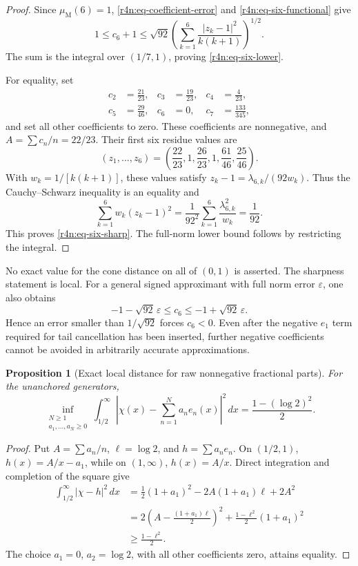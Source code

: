 \documentclass[11pt,a4paper]{article}
\newtheorem{proposition}[theorem]{Proposition}
\theoremstyle{definition}\newtheorem{definition}[theorem]{Definition}
\theoremstyle{remark}\newtheorem{remark}[theorem]{Remark}
\numberwithin{equation}{section}
\begin{document}
\begin{proof}
Since $\mu_{\mathrm M}(6)=1$,
\eqref{r4n:eq-coefficient-error} and \eqref{r4n:eq-six-functional}
give
\[
 1\le c_6+1
 \le\sqrt{92}
       \left(\sum_{k=1}^6\frac{|z_k-1|^2}{k(k+1)}\right)^{1/2}.
\]
The sum is the integral over $(1/7,1)$, proving
\eqref{r4n:eq-six-lower}.

For equality, set
\begin{equation}
\label{r4n:eq-six-coefficients}
 \begin{aligned}
 c_2&=\frac{21}{23},&
 c_3&=\frac{19}{23},&
 c_4&=\frac4{23},\\
 c_5&=\frac{29}{46},&
 c_6&=0,&
 c_7&=\frac{133}{345},
 \end{aligned}
\end{equation}
and set all other coefficients to zero.
These coefficients are nonnegative, and
$A=\sum c_n/n=22/23$.
Their first six residue values are
\[
 (z_1,\ldots,z_6)=
 \left(\frac{22}{23},1,\frac{26}{23},1,
                         \frac{61}{46},\frac{25}{46}\right).
\]
With $w_k=1/[k(k+1)]$, these values satisfy
$z_k-1=\lambda_{6,k}/(92w_k)$.
Thus the Cauchy--Schwarz inequality is an equality and
\[
 \sum_{k=1}^6w_k(z_k-1)^2
 =\frac1{92^2}\sum_{k=1}^6\frac{\lambda_{6,k}^2}{w_k}
 =\frac1{92}.
\]
This proves \eqref{r4n:eq-six-sharp}.
The full-norm lower bound follows by restricting the integral.
\end{proof}

No exact value for the cone distance on all of $(0,1)$ is asserted.
The sharpness statement is local.
For a general signed approximant with full norm error $\varepsilon$,
one also obtains
\[
 -1-\sqrt{92}\,\varepsilon\le c_6
                  \le-1+\sqrt{92}\,\varepsilon.
\]
Hence an error smaller than $1/\sqrt{92}$ forces $c_6<0$.
Even after the negative $e_1$ term required for tail cancellation
has been inserted, further negative coefficients cannot be avoided
in arbitrarily accurate approximations.

\begin{proposition}[Exact local distance for raw nonnegative fractional parts]
\label{r4n:prop-raw-positive}
For the unanchored generators,
\[
 \inf_{\substack{N\ge1\\a_1,\ldots,a_N\ge0}}
 \int_{1/2}^{\infty}
 \left|\chi(x)-\sum_{n=1}^Na_ne_n(x)\right|^2\,dx
 =\frac{1-(\log2)^2}{2}.
\]
\end{proposition}

\begin{proof}
Put $A=\sum a_n/n$, $\ell=\log2$, and $h=\sum a_ne_n$.
On $(1/2,1)$, $h(x)=A/x-a_1$, while on $(1,\infty)$,
$h(x)=A/x$.  Direct integration and completion of the square give
\begin{align*}
 \int_{1/2}^{\infty}|\chi-h|^2\,dx
 &=\frac12(1+a_1)^2-2A(1+a_1)\ell+2A^2\\
 &=2\left(A-\frac{(1+a_1)\ell}{2}\right)^2
       +\frac{1-\ell^2}{2}(1+a_1)^2\\
 &\ge\frac{1-\ell^2}{2}.
\end{align*}
The choice $a_1=0$, $a_2=\log2$, with all other coefficients zero,
attains equality.
\end{proof}
\end{document}
